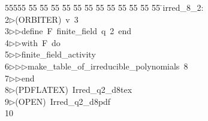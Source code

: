 %
%
\begin{tabbing}
55555 \= 55 \= 55 \= 55 \= 55 \= 55 \= 55 \= 55 \= 55 \= 55 \= 55 \= 55 \= 55 \= \>irred\_8\_2:\\[0pt]
2\>$\triangleright$\>(ORBITER)\ v\ 3\ \\[0pt]
3\>$\triangleright$\>$\triangleright$\>define\ F\ finite\_field\ q\ 2\ end\ \\[0pt]
4\>$\triangleright$\>$\triangleright$\>with\ F\ do\ \\[0pt]
5\>$\triangleright$\>$\triangleright$\>finite\_field\_activity\ \\[0pt]
6\>$\triangleright$\>$\triangleright$\>$\triangleright$\>make\_table\_of\_irreducible\_polynomials\ 8\ \\[0pt]
7\>$\triangleright$\>$\triangleright$\>end\\[0pt]
8\>$\triangleright$\>(PDFLATEX)\ Irred\_q2\_d8tex\\[0pt]
9\>$\triangleright$\>(OPEN)\ Irred\_q2\_d8pdf\\[0pt]
10\>\end{tabbing}
